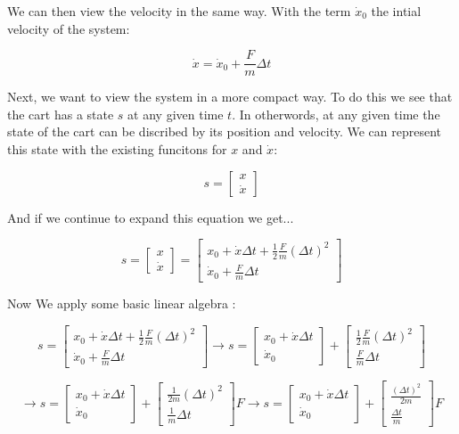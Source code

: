 \documentclass[11pt]{article}
\begin{document}
We can then view the velocity in the same way. With the term $\dot{x}_0$ the intial
velocity of the system:

\[
\dot{x} = \dot{x}_0 + \frac{F}{m} \Delta t
\]

Next, we want to view the system in a more compact way. To do this we see that the
cart has a state $s$ at any given time $t$. In otherwords, at any given time
the state of the cart can be discribed by its position and velocity. We can represent
this state with the existing funcitons for $x$ and $\dot{x}$:

\[
s =
\begin{bmatrix}
  x\\
  \dot{x}
\end{bmatrix}
\]

And if we continue to expand this equation we get...

\[
s =
\begin{bmatrix}
  x\\
  \dot{x}
\end{bmatrix}
=
\begin{bmatrix}
  x_0 + \dot{x} \Delta t + \frac{1}{2} \frac{F}{m} (\Delta t)^2\\
  \dot{x}_0 + \frac{F}{m} \Delta t
\end{bmatrix}
\]

Now We apply some basic linear algebra \cite{strang09}:

\[
s
=
\begin{bmatrix}
  x_0 + \dot{x} \Delta t + \frac{1}{2} \frac{F}{m} (\Delta t)^2\\
  \dot{x}_0 + \frac{F}{m} \Delta t
\end{bmatrix}
\rightarrow
s
=
\begin{bmatrix}
  x_0 + \dot{x} \Delta t\\
  \dot{x}_0
\end{bmatrix}
+
\begin{bmatrix}
  \frac{1}{2} \frac{F}{m} (\Delta t)^2\\
   \frac{F}{m} \Delta t
\end{bmatrix}
\]

\[
\rightarrow
s
=
\begin{bmatrix}
  x_0 + \dot{x} \Delta t\\
  \dot{x}_0
\end{bmatrix}
+
\begin{bmatrix}
  \frac{1}{2m} (\Delta t)^2\\
   \frac{1}{m} \Delta t
\end{bmatrix}
F
\rightarrow
s =
\begin{bmatrix}
  x_0 + \dot{x} \Delta t\\
  \dot{x}_0
\end{bmatrix}
+
\begin{bmatrix}
  \frac{(\Delta t)^2}{2m}\\
   \frac{\Delta t}{m}
\end{bmatrix}
F
\]
\end{document}
